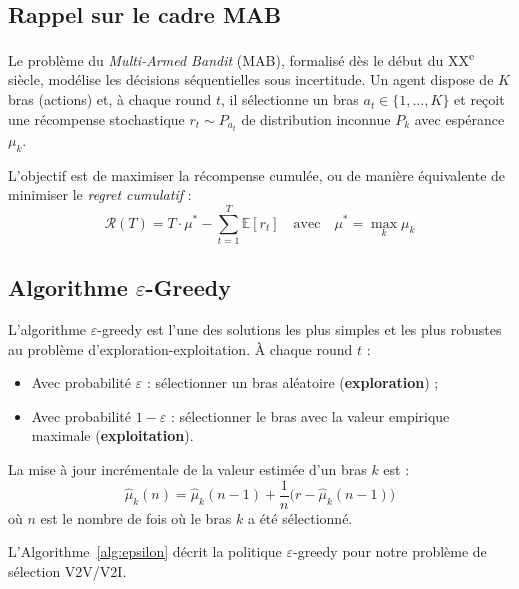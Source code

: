 \documentclass[12pt,a4paper]{article}
\begin{document}
\subsection{Rappel sur le cadre MAB}

Le problème du \textit{Multi-Armed Bandit} (MAB), formalisé dès le début du
XX\textsuperscript{e} siècle, modélise les décisions séquentielles sous incertitude.
Un agent dispose de $K$ bras (actions) et, à chaque round $t$, il sélectionne un
bras $a_t \in \{1, \ldots, K\}$ et reçoit une récompense stochastique $r_t \sim
P_{a_t}$ de distribution inconnue $P_k$ avec espérance $\mu_k$.

L'objectif est de maximiser la récompense cumulée, ou de manière équivalente de
minimiser le \textit{regret cumulatif} :
\begin{equation}
  \mathcal{R}(T) = T \cdot \mu^* - \sum_{t=1}^T \mathbb{E}[r_t]
  \quad \text{avec} \quad \mu^* = \max_k \mu_k
\end{equation}

\subsection{Algorithme $\varepsilon$-Greedy}

L'algorithme $\varepsilon$-greedy est l'une des solutions les plus simples et
les plus robustes au problème d'exploration-exploitation. À chaque round $t$ :
\begin{itemize}[leftmargin=*]
  \item Avec probabilité $\varepsilon$ : sélectionner un bras aléatoire
        (\textbf{exploration}) ;
  \item Avec probabilité $1 - \varepsilon$ : sélectionner le bras avec la valeur
        empirique maximale (\textbf{exploitation}).
\end{itemize}

La mise à jour incrémentale de la valeur estimée d'un bras $k$ est :
\begin{equation}
  \hat{\mu}_k(n) = \hat{\mu}_k(n-1) + \frac{1}{n}\bigl(r - \hat{\mu}_k(n-1)\bigr)
\end{equation}
où $n$ est le nombre de fois où le bras $k$ a été sélectionné.

L'Algorithme~\ref{alg:epsilon} décrit la politique $\varepsilon$-greedy pour
notre problème de sélection V2V/V2I.
\end{document}

